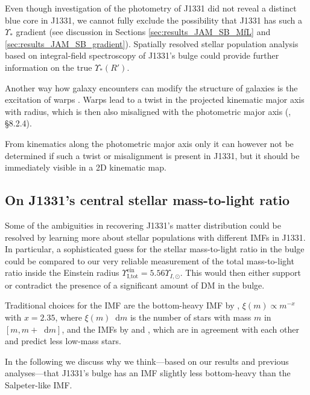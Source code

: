 \documentclass[useAMS,usenatbib]{mnras}
\newcommand*\diff{\mathop{}\!\mathrm{d}}
\begin{document}
Even though investigation of the photometry of J1331 did not reveal a distinct blue core in J1331, we cannot fully exclude the possibility that J1331 has such a $\Upsilon_*$ gradient (see discussion in Sections \ref{sec:results_JAM_SB_MfL} and \ref{sec:results_JAM_SB_gradient}). Spatially resolved stellar population analysis based on integral-field spectroscopy of J1331's bulge could provide further information on the true $\Upsilon_*(R')$.

Another way how galaxy encounters can modify the structure of galaxies is the excitation of warps \citep{1991wdir.book.....C,2013pss5.book..923S}. Warps lead to a twist in the projected kinematic major axis with radius, which is then also misaligned with the photometric major axis (\citealt{1998gaas.book.....B}, \S 8.2.4).

From kinematics along the photometric major axis only it can however not be determined if such a twist or misalignment is present in J1331, but it should be immediately visible in a 2D kinematic map.

\subsection{On J1331's central stellar mass-to-light ratio} \label{sec:MLdiscussion}

Some of the ambiguities in recovering J1331's matter distribution could be resolved by learning more about stellar populations with different IMFs in J1331. In particular, a sophisticated guess for the stellar mass-to-light ratio in the bulge could be compared to our very reliable measurement of the total mass-to-light ratio inside the Einstein radius $\Upsilon_\text{I,tot}^\text{ein} = 5.56 \Upsilon_{I,\odot}$. This would then either support or contradict the presence of a significant amount of DM in the bulge.

Traditional choices for the IMF are the bottom-heavy IMF by \citet{Salpeter1955}, $\xi(m) \propto m^{-x}$ with $x=2.35$, where $\xi(m) \diff m$ is the number of stars with mass $m$ in $[m,m+\diff m]$, and the IMFs by \citet{2002Sci...295...82K} and \citet{Chabrier2003}, which are in agreement with each other and predict less low-mass stars.

In the following we discuss why we think---based on our results and previous analyses---that J1331's bulge has an IMF slightly less bottom-heavy than the Salpeter-like IMF.
\end{document}
